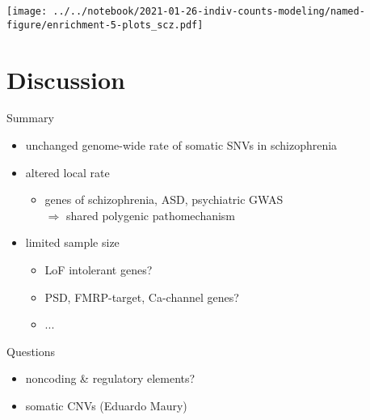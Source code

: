 \documentclass[usenames,dvipsnames]{beamer}
\begin{document}

\begin{frame}[label=results]
\texttt{[image: ../../notebook/2021-01-26-indiv-counts-modeling/named-figure/enrichment-5-plots\_scz.pdf]}
\end{frame}

\section{Discussion}




\begin{frame}{Summary}
\begin{itemize}
\item unchanged genome-wide rate of somatic SNVs in schizophrenia
\item altered local rate
\begin{itemize}
	\item genes of schizophrenia, ASD, psychiatric GWAS\\
		$\Rightarrow$ shared polygenic pathomechanism
\end{itemize}
\item limited sample size
\begin{itemize}
	\item LoF intolerant genes?
	\item PSD, FMRP-target, Ca-channel genes?
	\item ...
\end{itemize}
\end{itemize}
\end{frame}

\begin{frame}{Questions}
\begin{itemize}
\item noncoding \& regulatory elements?
\item somatic CNVs (Eduardo Maury)
\end{itemize}
\end{frame}
\end{document}

